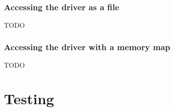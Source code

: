 \subsubsection{Accessing the driver as a file}
TODO %

\subsubsection{Accessing the driver with a memory map}
TODO %



\section{Testing}
